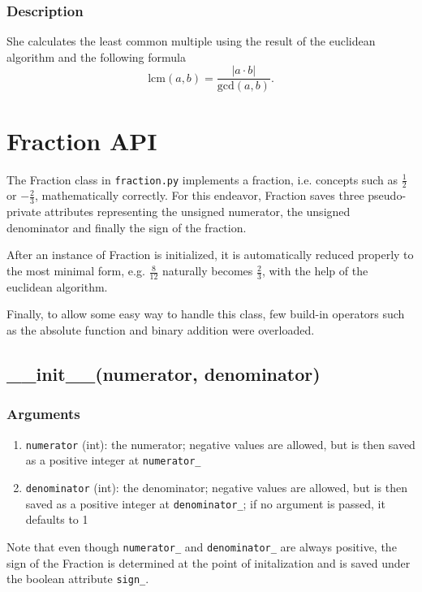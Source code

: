\documentclass[refman]{scrartcl}
\begin{document}
\subsubsection*{Description}

She calculates the least common multiple using the result of the euclidean algorithm and the following formula
%
\[\text{lcm}(a, b) = \frac{|a \cdot b|}{\text{gcd}(a, b)} \text{.}\]

\section{Fraction API}

The Fraction class in \texttt{fraction.py} implements a fraction, i.e. concepts such as \(\frac{1}{2}\) or \(-\frac{2}{3}\), mathematically correctly. For this endeavor, Fraction saves three pseudo-private attributes representing the unsigned numerator, the unsigned denominator and finally the sign of the fraction.

After an instance of Fraction is initialized, it is automatically reduced properly to the most minimal form, e.g. \(\frac{8}{12}\) naturally becomes \(\frac{2}{3}\), with the help of the euclidean algorithm.

Finally, to allow some easy way to handle this class, few build-in operators such as the absolute function and binary addition were overloaded.

\subsection{\_\_init\_\_(numerator, denominator)}

\subsubsection*{Arguments}

\begin{enumerate}
  \item \texttt{numerator} (int): the numerator; negative values are allowed, but is then saved as a positive integer at \texttt{numerator\_}
  \item \texttt{denominator} (int): the denominator; negative values are allowed, but is then saved as a positive integer at \texttt{denominator\_}; if no argument is passed, it defaults to 1
\end{enumerate}

Note that even though \texttt{numerator\_} and \texttt{denominator\_} are always positive, the sign of the Fraction is determined at the point of initalization and is saved under the boolean attribute \texttt{sign\_}.
\end{document}
